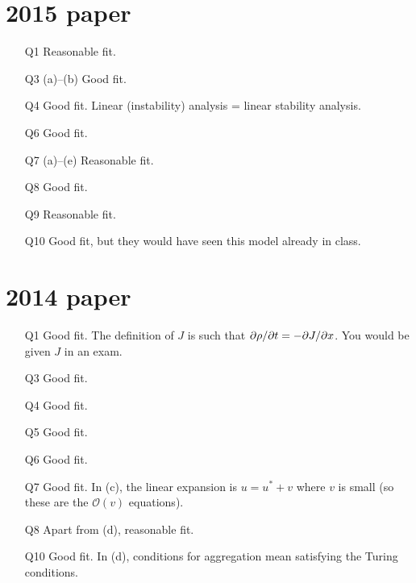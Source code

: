 \begin{multicols}{2}
\section*{2015 paper}
\begin{itemize}
\item[Q1] Reasonable fit. 
\item[Q3] (a)--(b) Good fit. 
\item[Q4] Good fit. Linear (instability) analysis = linear stability analysis.
\item[Q6] Good fit.
\item[Q7] (a)--(e) Reasonable fit.
\item[Q8] Good fit.
\item[Q9] Reasonable fit.
\item[Q10] Good fit, but they would have seen this model already in class.
\end{itemize}

\section*{2014 paper}
\begin{itemize}
\item[Q1] Good fit. The definition of $J$ is such that $\pd{\rho}{t} = -\pd{J}{x}$. You would be given $J$ in an exam.
\item[Q3] Good fit.
\item[Q4] Good fit.
\item[Q5] Good fit. 
\item[Q6] Good fit.
\item[Q7] Good fit. In (c), the linear expansion is $u = u^* + v$ where $v$ is small (so these are the $\mathcal{O}(v)$ equations).
\item[Q8] Apart from (d), reasonable fit.
\item[Q10] Good fit. In (d), conditions for aggregation mean satisfying the Turing conditions.
\end{itemize}


\end{multicols}
